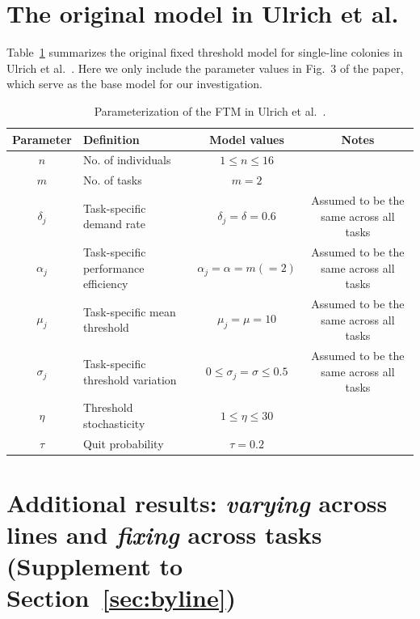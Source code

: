 \documentclass[11pt]{article}
\begin{document}
\newpage
\begin{appendices}

\section{The original model in Ulrich et al.} \label{sec:original}
Table~\ref{tab:original} summarizes the original fixed threshold model for single-line colonies in Ulrich et al.~\cite{ulrich2018}.  Here we only include the parameter values in Fig.~3 of the paper, which serve as the base model for our investigation.

\begin{table}[H] \small
  \begin{center}
    \begin{tabular}{|c|>{\centering}p{2.05in}|c|c|} 
      \hline
      \textbf{Parameter} & \textbf{Definition} & \textbf{Model values} & \textbf{Notes} \\ \hline
      $n$ & No. of individuals & $1\leq n \leq16$ & \\ \hline
      $m$ & No. of tasks & $m = 2$ & \\ \hline
      $\delta_j$ & Task-specific demand rate & $\delta_j = \delta = 0.6$ & Assumed to be the same across all tasks \\ \hline
      $\alpha_j$ & Task-specific performance efficiency & $\alpha_j = \alpha = m(=2) $ & Assumed to be the same across all tasks \\ \hline
      $\mu_j$ & Task-specific mean threshold & $\mu_j = \mu = 10$ & Assumed to be the same across all tasks \\ \hline
      $\sigma_j$ & Task-specific threshold variation & $0 \leq \sigma_j = \sigma \leq 0.5$ & Assumed to be the same across all tasks \\ \hline
      $\eta$ & Threshold stochasticity & $1 \leq \eta \leq 30 $ & \\ \hline
      $\tau$ & Quit probability & $\tau = 0.2$ & \\ \hline
    \end{tabular}
    \caption{Parameterization of the FTM in Ulrich et al.~\cite{ulrich2018}.}
    \label{tab:original}
  \end{center}
\end{table}


\section{Additional results: \textit{varying} across lines and \textit{fixing} across tasks (Supplement to Section~\ref{sec:byline})}


\end{appendices}
\end{document}
